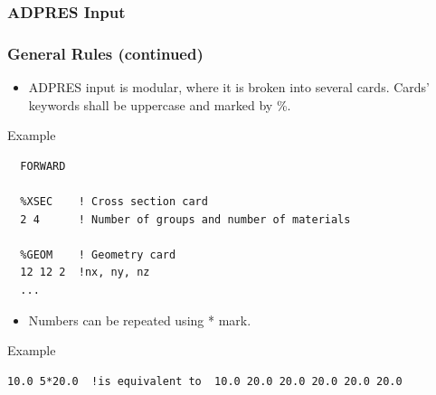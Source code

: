 \documentclass{beamer}
\begin{document}
\begin{frame}[fragile]
\frametitle{ADPRES Input}
\frametitle{General Rules (continued)}
\begin{itemize}
    \item ADPRES input is modular, where it is broken into several cards. Cards’ keywords shall be uppercase and marked by \%.
\end{itemize}
\begin{block}{Example}
\begin{Verbatim}[fontsize=\small]
  %MODE
  FORWARD

  %XSEC    ! Cross section card
  2 4      ! Number of groups and number of materials

  %GEOM    ! Geometry card
  12 12 2  !nx, ny, nz
  ...
\end{Verbatim}
\end{block}
\begin{itemize}
    \item Numbers can be repeated using * mark.
\end{itemize}
\begin{block}{Example}
\begin{Verbatim}[fontsize=\small]
10.0 5*20.0  !is equivalent to  10.0 20.0 20.0 20.0 20.0 20.0
\end{Verbatim}
\end{block}
\end{frame}

\end{document}
